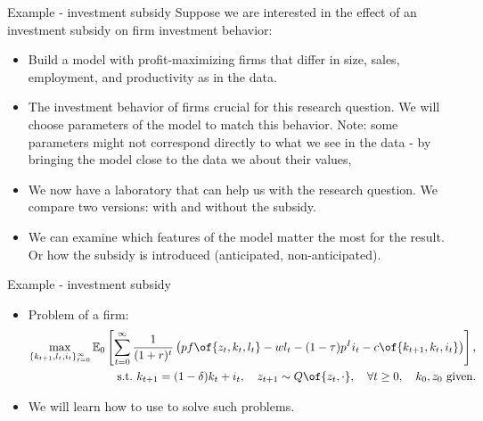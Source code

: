 \documentclass[11pt,xcolor={dvipsnames},aspectratio=159,hyperref={pdftex,pdfpagemode=UseNone,hidelinks,pdfdisplaydoctitle=true},usepdftitle=false]{beamer}
\begin{document}
\begin{frame}{Example - investment subsidy}
    Suppose we are interested in the effect of an investment subsidy on firm investment behavior:
    \begin{itemize} 
        \item Build a model with profit-maximizing firms that differ in size, sales, employment, and productivity as in the data.
        \item The investment behavior of firms crucial for this research question. We will choose parameters of the model to match this behavior. Note: some parameters might not correspond directly to what we see in the data - by bringing the model close to the data we  about their values, 
        \item We now have a laboratory that can help us with the research question. We compare two versions: with and without the subsidy. 
        \item We can examine which features of the model matter the most for the result. Or how the subsidy is introduced (anticipated, non-anticipated). 
    \end{itemize}
\end{frame}

\begin{frame}{Example - investment subsidy}
    \begin{itemize}
     \item Problem of a firm:  \begin{align*}
\max_{\{k_{t+1},l_t,i_t\}_{t=0}^{\infty}} \mathbb{E}_0 \left[ \sum_{t=0}^{\infty} \frac{1}{(1+r)^t} \left( p f\of{z_t,k_t,l_t} - wl_t - (1-\tau) p^I i_t - c\of{k_{t+1},k_t,i_t} \right) \right], \\ 
        \text{s.t.} \ k_{t+1} = (1-\delta) k_t + i_t, \quad z_{t+1} \sim Q\of{z_t,\cdot}, \quad \forall t \geq 0, \quad k_0, z_0 \ \text{given}.
  \end{align*}
     \item We will learn how to use  to solve such problems. 
    \end{itemize} 
    \end{frame}
\end{document}
